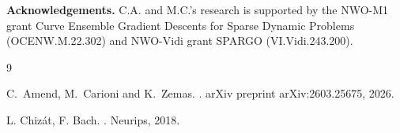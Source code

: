 \documentclass[11pt]{article}
\begin{document}
\vspace{1em}

\noindent
\textbf{Acknowledgements.}
C.A. and M.C.’s research is supported by the NWO-M1 grant Curve Ensemble Gradient Descents for
Sparse Dynamic Problems (OCENW.M.22.302) and NWO-Vidi grant SPARGO (VI.Vidi.243.200).

\vspace{1em}

\begin{thebibliography}{9}

C.~Amend, M.~Carioni and K.~Zemas.
.
\newblock arXiv preprint arXiv:2603.25675, 2026.

L. Chizát, F. Bach.
.
\newblock Neurips, 2018.

\end{thebibliography}
\end{document}
